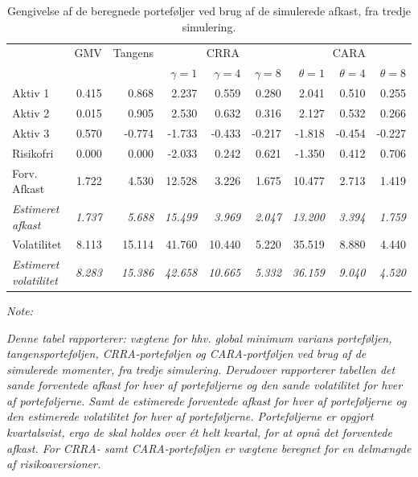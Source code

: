 \documentclass[
  a4paper,
  oneside]{memoir}
\begin{document}
\begin{table}[!h]

\caption{\label{tab:sum-3}Gengivelse af de beregnede porteføljer ved brug af de simulerede afkast, fra tredje simulering.}
\centering
\begin{threeparttable}
\begin{tabular}[t]{lrrrrrrrr}
\toprule
\multicolumn{1}{c}{ } & \multicolumn{1}{c}{GMV} & \multicolumn{1}{c}{Tangens} & \multicolumn{3}{c}{CRRA} & \multicolumn{3}{c}{CARA} \\
\cmidrule(l{3pt}r{3pt}){2-2} \cmidrule(l{3pt}r{3pt}){3-3} \cmidrule(l{3pt}r{3pt}){4-6} \cmidrule(l{3pt}r{3pt}){7-9}
  &   &   & $\gamma=1$ & $\gamma=4$ & $\gamma=8$ & $\theta=1$ & $\theta=4$ & $\theta=8$\\
\midrule
\rowcolor{gray!6}  Aktiv 1 & 0.415 & 0.868 & 2.237 & 0.559 & 0.280 & 2.041 & 0.510 & 0.255\\
Aktiv 2 & 0.015 & 0.905 & 2.530 & 0.632 & 0.316 & 2.127 & 0.532 & 0.266\\
\rowcolor{gray!6}  Aktiv 3 & 0.570 & -0.774 & -1.733 & -0.433 & -0.217 & -1.818 & -0.454 & -0.227\\
Risikofri & 0.000 & 0.000 & -2.033 & 0.242 & 0.621 & -1.350 & 0.412 & 0.706\\
\rowcolor{gray!6}  Forv. Afkast & 1.722 & 4.530 & 12.528 & 3.226 & 1.675 & 10.477 & 2.713 & 1.419\\
\em{Estimeret afkast} & \em{1.737} & \em{5.688} & \em{15.499} & \em{3.969} & \em{2.047} & \em{13.200} & \em{3.394} & \em{1.759}\\
\rowcolor{gray!6}  Volatilitet & 8.113 & 15.114 & 41.760 & 10.440 & 5.220 & 35.519 & 8.880 & 4.440\\
\em{Estimeret volatilitet} & \em{8.283} & \em{15.386} & \em{42.658} & \em{10.665} & \em{5.332} & \em{36.159} & \em{9.040} & \em{4.520}\\
\bottomrule
\end{tabular}
\begin{tablenotes}
\item \textit{Note: } 
\item \textit{Denne tabel rapporterer: vægtene for hhv. global minimum varians porteføljen, tangensporteføljen, CRRA-porteføljen og CARA-portføljen ved brug af de simulerede momenter, fra tredje simulering. Derudover rapporterer tabellen det sande forventede afkast for hver af porteføljerne og den sande volatilitet for hver af porteføljerne. Samt de estimerede forventede afkast for hver af porteføljerne og den estimerede volatilitet for hver af porteføljerne. Porteføljerne er opgjort kvartalsvist, ergo de skal holdes over ét helt kvartal, for at opnå det forventede afkast. For CRRA- samt CARA-porteføljen er vægtene beregnet for en delmængde af risikoaversioner.}
\end{tablenotes}
\end{threeparttable}
\end{table}
\end{document}
